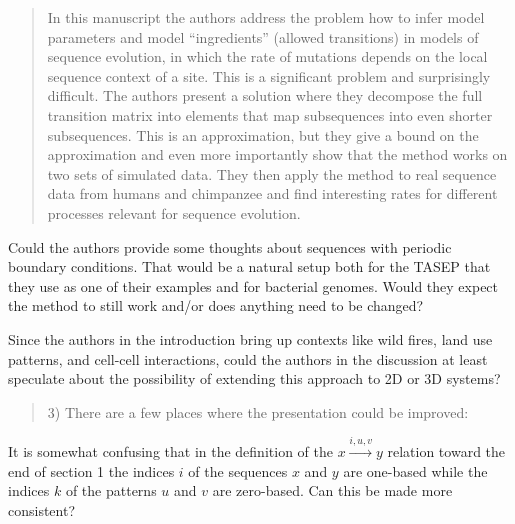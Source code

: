 \begin{quote}
In this manuscript the authors address the problem how to infer model
parameters and model ``ingredients'' (allowed transitions) in models of
sequence evolution, in which the rate of mutations depends on the
local sequence context of a site. This is a significant problem and
surprisingly difficult. The authors present a solution where they
decompose the full transition matrix into elements that map
subsequences into even shorter subsequences. This is an approximation,
but they give a bound on the approximation and even more importantly
show that the method works on two sets of simulated data. They then
apply the method to real sequence data from humans and chimpanzee and
find interesting rates for different processes relevant for sequence
evolution.
\end{quote}


\begin{point}{}
Could the authors provide some thoughts about sequences with
periodic boundary conditions. That would be a natural setup both for
the TASEP that they use as one of their examples and for bacterial
genomes. Would they expect the method to still work and/or does
anything need to be changed?
\end{point}


\begin{point}{}
Since the authors in the introduction bring up contexts like wild
fires, land use patterns, and cell-cell interactions, could the
authors in the discussion at least speculate about the possibility of
extending this approach to 2D or 3D systems?
\end{point}


\begin{quote}
3) There are a few places where the presentation could be improved:
\end{quote}

\begin{point}{}
It is somewhat confusing that in the definition of the
$ x \xrightarrow{i,u,v} y$
relation toward the end of section 1 \revref{}
the indices $i$ of the sequences
$x$ and $y$ are one-based while the indices $k$ of the patterns $u$ and $v$ are
zero-based. Can this be made more consistent?
\end{point}


